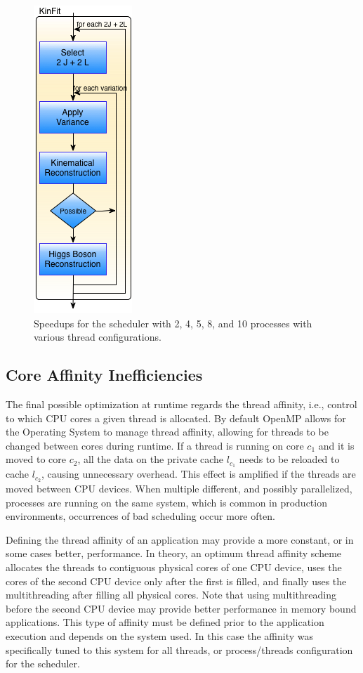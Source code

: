 \begin{figure}[!htp]
	\begin{center}
		\includegraphics[scale=0.6]{images/sequential_kinfit.png}
		\caption{Speedups for the scheduler with 2, 4, 5, 8, and 10 processes with various thread configurations.}
		\label{fig:Sched}
	\end{center}
\end{figure}

\subsection{Core Affinity Inefficiencies}

The final possible optimization at runtime regards the thread affinity, i.e., control to which CPU cores a given thread is allocated. By default OpenMP allows for the Operating System to manage thread affinity, allowing for threads to be changed between cores during runtime. If a thread is running on core $c_1$ and it is moved to core $c_2$, all the data on the private cache $l_{c_1}$ needs to be reloaded to cache $l_{c_2}$, causing unnecessary overhead. This effect is amplified if the threads are moved between CPU devices. When multiple different, and possibly parallelized, processes are running on the same system, which is common in production environments, occurrences of bad scheduling occur more often.

Defining the thread affinity of an application may provide a more constant, or in some cases better, performance. In theory, an optimum thread affinity scheme allocates the threads to contiguous physical cores of one CPU device, uses the cores of the second CPU device only after the first is filled, and finally uses the multithreading after filling all physical cores. Note that using multithreading before the second CPU device may provide better performance in memory bound applications. This type of affinity must be defined prior to the application execution and depends on the system used. In this case the affinity was specifically tuned to this system for all threads, or process/threads configuration for the scheduler.

